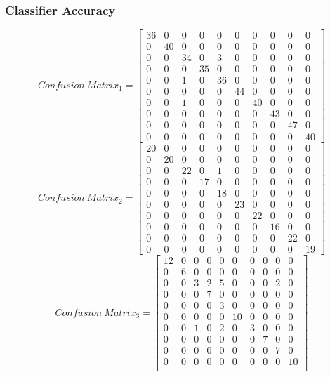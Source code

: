 \documentclass{article}
\begin{document}
			\subsubsection{Classifier Accuracy} \label{S531}
			\[
			Confusion~Matrix_{1} = 
			\begin{bmatrix}
			36&0&0&0&0&0&0&0&0&0\\
			0&40&0&0&0&0&0&0&0&0\\
			0&0&34&0&3&0&0&0&0&0\\
			0&0&0&35&0&0&0&0&0&0\\
			0&0&1&0&36&0&0&0&0&0\\
			0&0&0&0&0&44&0&0&0&0\\
			0&0&1&0&0&0&40&0&0&0\\
			0&0&0&0&0&0&0&43&0&0\\
			0&0&0&0&0&0&0&0&47&0\\
			0&0&0&0&0&0&0&0&0&40
			\end{bmatrix}
			\]
			\[
			Confusion~Matrix_{2} = 
			\begin{bmatrix}
			20&0&0&0&0&0&0&0&0&0\\
			0&20&0&0&0&0&0&0&0&0\\
			0&0&22&0&1&0&0&0&0&0\\
			0&0&0&17&0&0&0&0&0&0\\
			0&0&0&0&18&0&0&0&0&0\\
			0&0&0&0&0&23&0&0&0&0\\
			0&0&0&0&0&0&22&0&0&0\\
			0&0&0&0&0&0&0&16&0&0\\
			0&0&0&0&0&0&0&0&22&0\\
			0&0&0&0&0&0&0&0&0&19
			\end{bmatrix}
			\]
			\[
			Confusion~Matrix_{3} = 
			\begin{bmatrix}
			12&0&0&0&0&0&0&0&0&0\\
			0&6&0&0&0&0&0&0&0&0\\
			0&0&3&2&5&0&0&0&2&0\\
			0&0&0&7&0&0&0&0&0&0\\
			0&0&0&0&3&0&0&0&0&0\\
			0&0&0&0&0&10&0&0&0&0\\
			0&0&1&0&2&0&3&0&0&0\\
			0&0&0&0&0&0&0&7&0&0\\
			0&0&0&0&0&0&0&0&7&0\\
			0&0&0&0&0&0&0&0&0&10\\
			\end{bmatrix}
			\]
			\linebreak
			
\end{document}
